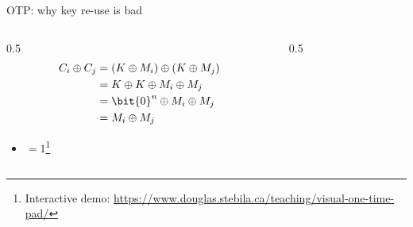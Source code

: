\ifdefined\PRESENTATION\else\PassOptionsToClass{handout}{beamer}\fi\documentclass[aspectratio=169, lualatex]{beamer}
\begin{document}
\begin{frame}{OTP: why key re-use is bad}
	\begin{columns}[c]
		\begin{column}{0.5\textwidth}
			\begin{align*}
				C_i \oplus C_j & = (K \oplus M_i) \oplus (K \oplus M_j) \\
				               & = K \oplus K \oplus M_i \oplus M_j     \\
				               & = \bit{0}^n \oplus M_i \oplus M_j      \\
				               & = M_i \oplus M_j
			\end{align*}
			\begin{itemize}
				\item {} $= 1$\footnote{Interactive demo: \url{https://www.douglas.stebila.ca/teaching/visual-one-time-pad/}}
			\end{itemize}
		\end{column}
		\begin{column}{0.5\textwidth}
			\begin{flushright}
			\end{flushright}
		\end{column}
	\end{columns}
\end{frame}
\end{document}

